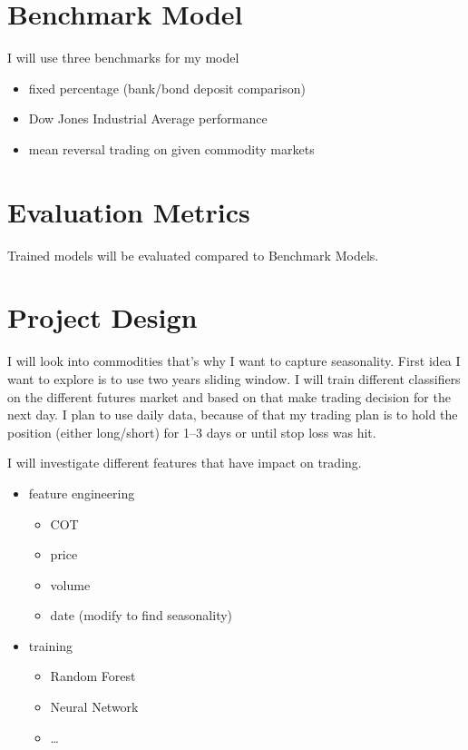 \documentclass[final,2p]{elsarticle}
\begin{document}
\section{Benchmark Model}

I will use three benchmarks for my model

\begin{itemize}
    \item fixed percentage (bank/bond deposit comparison)
    \item Dow Jones Industrial Average performance
    \item mean reversal trading on given commodity markets
\end{itemize}

\section{Evaluation Metrics}

Trained models will be evaluated compared to Benchmark Models.

\section{Project Design}

I will look into commodities that's why I want to capture seasonality.
First idea I want to explore is to use two years sliding window. I will train different classifiers on the different futures market and 
based on that make trading decision for the next day. I plan to use daily data, because of that my trading plan is to hold the position (either long/short) for 1--3 days or until stop loss was hit.

I will investigate different features that have impact on trading.

\begin{itemize}
    \item feature engineering
    \begin{itemize}
        \item COT
        \item price
        \item volume
        \item date (modify to find seasonality)
    \end{itemize}
    \item training
    \begin{itemize}
        \item Random Forest
        \item Neural Network
        \item \ldots
    \end{itemize}
\end{itemize}
\end{document}
